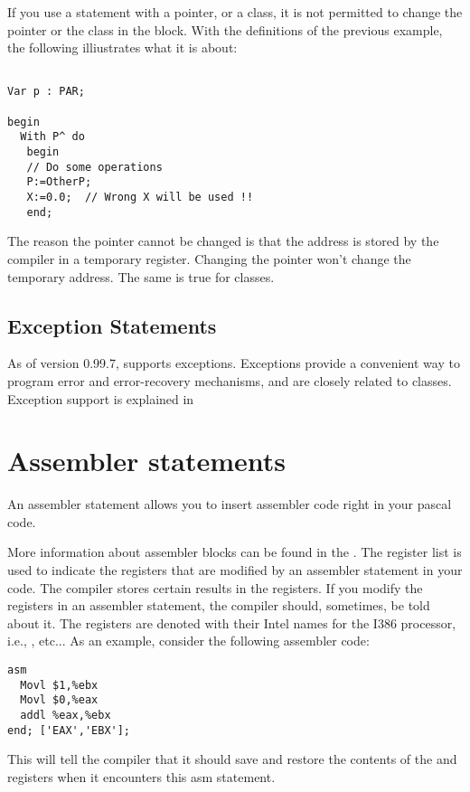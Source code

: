 \documentclass{report}
\begin{document}
\begin{remark}
If you use a  statement with a pointer, or a class, it is not
permitted to change the pointer or the class in the  block.
With the definitions of the previous example, the following illiustrates
what it is about:
\begin{verbatim}

Var p : PAR;

begin
  With P^ do
   begin
   // Do some operations
   P:=OtherP;
   X:=0.0;  // Wrong X will be used !!
   end;
\end{verbatim}
The reason the pointer cannot be changed is that the address is stored 
by the compiler in a temporary register. Changing the pointer won't change
the temporary address. The same is true for classes.
\end{remark}

\subsection{Exception Statements}
As of version 0.99.7, \fpc supports exceptions. Exceptions provide a
convenient way to program error and error-recovery mechanisms, and are
closely related to classes.
Exception support is explained in 

\section{Assembler statements}
An assembler statement allows you to insert assembler code right in your
pascal code.

More information about assembler blocks can be found in the \progref.
The register list is used to indicate the registers that are modified by an
assembler statement in your code. The compiler stores certain results in the
registers. If you modify the registers in an assembler statement, the compiler
should, sometimes, be told about it. The registers are denoted with their
Intel names for the I386 processor, i.e., ,  etc...
As an example, consider the following assembler code:
\begin{verbatim}
asm
  Movl $1,%ebx
  Movl $0,%eax
  addl %eax,%ebx
end; ['EAX','EBX'];
\end{verbatim}
This will tell the compiler that it should save and restore the contents of
the  and  registers when it encounters this asm statement.
\end{document}
